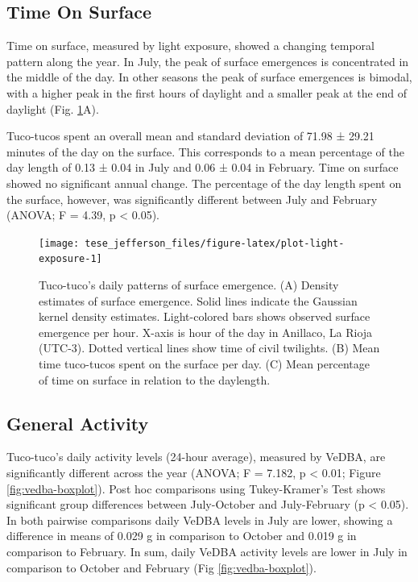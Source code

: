 \documentclass[english,msc,numbers,hidelinks]{coppe}
\begin{document}
  \hypertarget{time-on-surface}{%
  \subsection{Time On Surface}\label{time-on-surface}}

  Time on surface, measured by light exposure, showed a changing temporal pattern along the year. In July, the peak of surface emergences is concentrated in the middle of the day. In other seasons the peak of surface emergences is bimodal, with a higher peak in the first hours of daylight and a smaller peak at the end of daylight (Fig. \ref{fig:plot-light-exposure}A).

  Tuco-tucos spent an overall mean and standard deviation of 71.98 ± 29.21 minutes of the day on the surface. This corresponds to a mean percentage of the day length of 0.13 ± 0.04 in July and 0.06 ± 0.04 in February. Time on surface showed no significant annual change. The percentage of the day length spent on the surface, however, was significantly different between July and February (ANOVA; F = 4.39, p \textless{} 0.05). \newline
  \begin{figure}[H]

  {\centering \texttt{[image: tese\_jefferson\_files/figure-latex/plot-light-exposure-1]} 

  }

  \caption{Tuco-tuco's daily patterns of surface emergence. (A) Density estimates of surface emergence. Solid lines indicate the Gaussian kernel density estimates. Light-colored bars shows observed surface emergence per hour. X-axis is hour of the day in Anillaco, La Rioja (UTC-3). Dotted vertical lines show time of civil twilights. (B) Mean time tuco-tucos spent on the surface per day. (C) Mean percentage of time on surface in relation to the daylength.}\label{fig:plot-light-exposure}
  \end{figure}
  \clearpage

  \hypertarget{general-activity}{%
  \subsection{General Activity}\label{general-activity}}

  Tuco-tuco's daily activity levels (24-hour average), measured by VeDBA, are significantly different across the year (ANOVA; F = 7.182, p \textless{} 0.01; Figure \ref{fig:vedba-boxplot}). Post hoc comparisons using Tukey-Kramer's Test shows significant group differences between July-October and July-February (p \textless{} 0.05). In both pairwise comparisons daily VeDBA levels in July are lower, showing a difference in means of 0.029 g in comparison to October and 0.019 g in comparison to February. In sum, daily VeDBA activity levels are lower in July in comparison to October and February (Fig \ref{fig:vedba-boxplot}).
\end{document}
